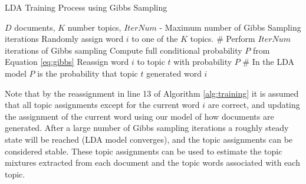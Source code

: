             \begin{algorithm}
                \caption{LDA Training Process using Gibbs Sampling}
                \label{alg:training}
                \begin{algorithmic}[1]
                    \REQUIRE $D$ documents, $K$ number topics, $IterNum$ - Maximum number of Gibbs Sampling iterations 
                            \STATE Randomly assign word $i$ to one of the $K$ topics.
                        \ENDFOR
                    \ENDFOR
                    \STATE
                    \STATE \# Perform $IterNum$ iterations of Gibbs sampling
                                    \STATE Compute full conditional probability $P$ from Equation \ref{eq:gibbs}
                                    \STATE Reassign word $i$ to topic $t$ with probability $P$
                                    \STATE \# In the LDA model $P$ is the probability that topic $t$ generated word $i$
                                \ENDFOR
                            \ENDFOR
                        \ENDFOR
                    \ENDFOR
                \end{algorithmic}
            \end{algorithm} 
                
        Note that by the reassignment in line 13 of Algorithm \ref{alg:training} it is assumed that all topic assignments except for the current word $i$ are correct, and updating the assignment of the current word using our model of how documents are generated. After a large number of Gibbs sampling iterations a roughly steady state will be reached (LDA model converges), and the topic assignments can be considered stable. These topic assignments can be used to estimate the topic mixtures extracted from each document and the topic words associated with each topic.
        
        
